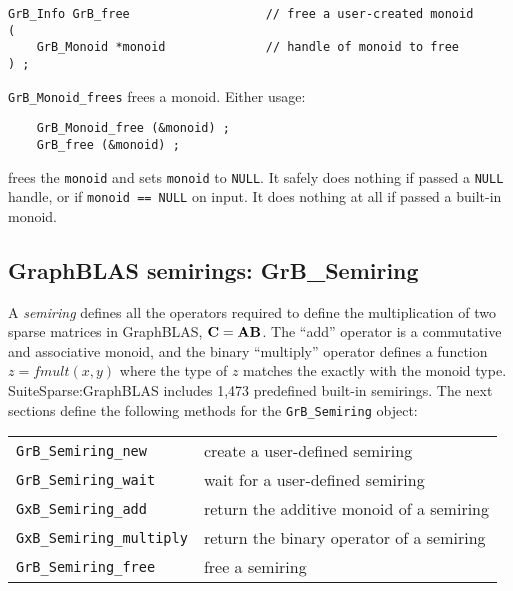 \documentclass[12pt]{article}
\begin{document}
\begin{mdframed}[userdefinedwidth=6in]
{\footnotesize
\begin{verbatim}
GrB_Info GrB_free                   // free a user-created monoid
(
    GrB_Monoid *monoid              // handle of monoid to free
) ;
\end{verbatim}
} \end{mdframed}

\verb'GrB_Monoid_frees' frees a monoid.  Either usage:

    {\small
    \begin{verbatim}
    GrB_Monoid_free (&monoid) ;
    GrB_free (&monoid) ; \end{verbatim}}

\noindent
frees the \verb'monoid' and sets \verb'monoid' to \verb'NULL'.  It safely does
nothing if passed a \verb'NULL' handle, or if \verb'monoid == NULL' on input.
It does nothing at all if passed a built-in monoid.

\newpage
\subsection{GraphBLAS semirings: {\sf GrB\_Semiring}} %
\label{semiring}

A {\em semiring} defines all the operators required to define the
multiplication of two sparse matrices in GraphBLAS, ${\bf C=AB}$.  The ``add''
operator is a commutative and associative monoid, and the binary ``multiply''
operator defines a function $z=fmult(x,y)$ where the type of $z$ matches the
exactly with the monoid type.  SuiteSparse:GraphBLAS includes 1,473 predefined
built-in semirings.  The next sections define the following methods for the
\verb'GrB_Semiring' object:

\vspace{0.2in}
{\footnotesize
\begin{tabular}{ll}
\hline
\verb'GrB_Semiring_new'       & create a user-defined semiring \\
\verb'GrB_Semiring_wait'      & wait for a user-defined semiring \\
\verb'GxB_Semiring_add'       & return the additive monoid of a semiring \\
\verb'GxB_Semiring_multiply'  & return the binary operator of a semiring \\
\verb'GrB_Semiring_free'      & free a semiring \\
\hline
\end{tabular}
}
\end{document}
